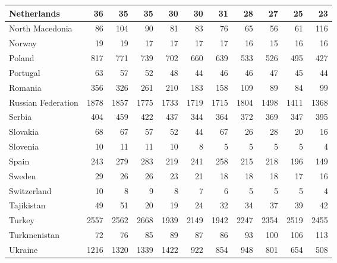 \begin{table}
\begin{tabular}{|l|r|r|r|r|r|r|r|r|r|r|}
                   Netherlands&     36&     35&     35&     30&     30&     31&     28&     27&     25&     23\\\hline
               North Macedonia&     86&    104&     90&     81&     83&     76&     65&     56&     61&    116\\\hline
                        Norway&     19&     19&     17&     17&     17&     17&     16&     15&     16&     16\\\hline
                        Poland&    817&    771&    739&    702&    660&    639&    533&    526&    495&    427\\\hline
                      Portugal&     63&     57&     52&     48&     44&     46&     46&     47&     45&     44\\\hline
                       Romania&    356&    326&    261&    210&    183&    158&    109&     89&     84&     99\\\hline
            Russian Federation&   1878&   1857&   1775&   1733&   1719&   1715&   1804&   1498&   1411&   1368\\\hline
                        Serbia&    404&    459&    422&    437&    344&    364&    372&    369&    347&    395\\\hline
                      Slovakia&     68&     67&     57&     52&     44&     67&     26&     28&     20&     16\\\hline
                      Slovenia&     10&     11&     11&     10&      8&      5&      5&      5&      5&      4\\\hline
                         Spain&    243&    279&    283&    219&    241&    258&    215&    218&    196&    149\\\hline
                        Sweden&     29&     26&     26&     23&     21&     18&     18&     18&     17&     16\\\hline
                   Switzerland&     10&      8&      9&      8&      7&      6&      5&      5&      5&      4\\\hline
                    Tajikistan&     49&     51&     20&     19&     24&     32&     34&     37&     39&     42\\\hline
                        Turkey&   2557&   2562&   2668&   1939&   2149&   1942&   2247&   2354&   2519&   2455\\\hline
                  Turkmenistan&     72&     76&     85&     89&     87&     86&     93&    100&    106&    113\\\hline
                       Ukraine&   1216&   1320&   1339&   1422&    922&    854&    948&    801&    654&    508\\\hline

\end{tabular}
\end{table}
